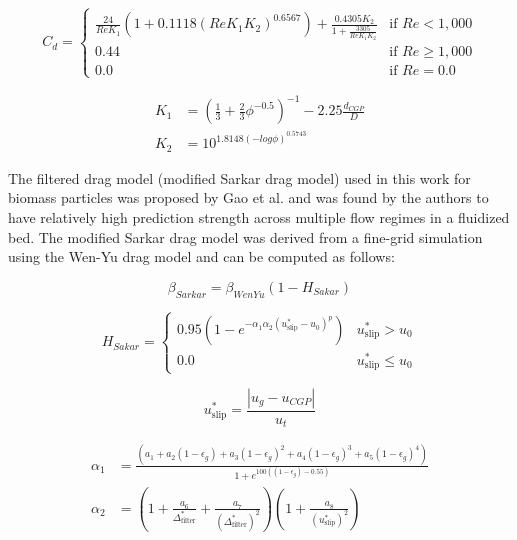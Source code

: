 \begin{equation}
    C_d =
    \begin{cases}
        \frac{24}{Re K_1} (1 + 0.1118(Re K_1 K_2)^{0.6567}) + \frac{0.4305 K_2}{1 + \frac{3305}{Re K_1 K_2}} & \text{if } Re < 1,000 \\
        0.44 & \text{if } Re \geq 1,000 \\
        0.0 & \text{if } Re = 0.0
    \end{cases}
\end{equation}

\begin{align}
    K_1 &= \left(\frac{1}{3} + \frac{2}{3} \phi^{-0.5} \right)^{-1} - 2.25 \frac{d_{CGP}}{D} \\
    K_2 &= 10^{1.8148 (-log \phi)^{0.5743}}
\end{align}

The filtered drag model (modified Sarkar drag model) used in this work for biomass particles was proposed by Gao et al. \cite{Gao-2018} and was found by the authors to have relatively high prediction strength across multiple flow regimes in a fluidized bed. The modified Sarkar drag model was derived from a fine-grid simulation using the Wen-Yu drag model and can be computed as follows:

\begin{equation}
    \beta_{Sarkar} = \beta_{WenYu} (1 - H_{Sakar})
\end{equation}

\begin{equation}
    H_{Sakar} =
    \begin{cases}
        0.95 \left(1 - e^{-\alpha_1 \alpha_2 (u_{\text{slip}}^* - u_0)^p} \right) & u_{\text{slip}}^* > u_0 \\
        0.0 & u_{\text{slip}}^* \leq u_0
    \end{cases}
\end{equation}

\begin{equation}
    u_{\text{slip}}^* = \frac{|u_g - u_{CGP}|}{u_t}
\end{equation}

\begin{align}
    \alpha_1 &= \frac{\left(a_1 + a_2(1 - \epsilon_g) + a_3(1 - \epsilon_g)^2 + a_4(1 - \epsilon_g)^3 + a_5(1 - \epsilon_g)^4 \right)}{1 + e^{100 \left((1 - \epsilon_g) - 0.55 \right)}} \\
    \alpha_2 &= \left(1 + \frac{a_6}{\Delta_{\text{filter}}^*} + \frac{a_7}{(\Delta_{\text{filter}}^*)^2} \right) \left(1 + \frac{a_8}{(u_{\text{slip}}^*)^2} \right)
\end{align}

